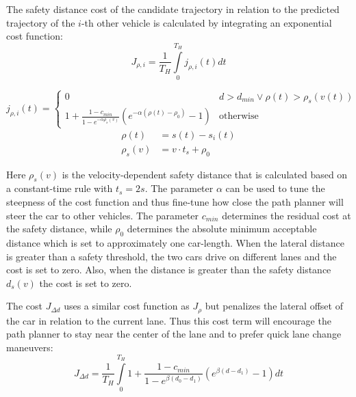 \documentclass[twoside]{article}
\begin{document}
The safety distance cost of the candidate trajectory in relation to the predicted trajectory of the $i$-th other vehicle is calculated by integrating an exponential cost function:
\begin{equation}
J_{\rho,i} = \frac{1}{T_H} \int\limits_0^{T_H} j_{\rho,i}(t) dt
\end{equation}

\begin{equation}
j_{\rho,i}(t) =
\begin{cases}
  0 & d > d_{min} \vee \rho(t) > \rho_s(v(t)) \\
  1 + \frac{1 - c_{min}}{1-e^{-\alpha \rho_s(v)}} \left(e^{-\alpha(\rho(t) - \rho_{0})} - 1 \right) & \text{otherwise}
  \end{cases}
\end{equation}
\begin{align}
\rho(t) &= s(t) - s_i(t) \\
\rho_s(v) &= v \cdot t_s + \rho_0
\end{align}

Here $\rho_s(v)$ is the velocity-dependent safety distance that is calculated based on
a constant-time rule with $t_s = 2s$. The parameter $\alpha$ can be used to tune the steepness
of the cost function and thus fine-tune how close the path planner will steer the car to
other vehicles. The parameter $c_{min}$ determines the residual cost at the safety distance,
while $\rho_0$ determines the absolute minimum acceptable distance which is set to approximately
one car-length. When the lateral distance is greater than a safety threshold, the two cars drive on different lanes and the cost is set to zero. Also, when the distance is greater than
the safety distance $d_s(v)$ the cost is set to zero.

The cost $J_{\Delta d}$ uses a similar cost function as $J_{\rho}$ but penalizes the lateral
offset of the car in relation to the current lane. Thus this cost term will encourage the
path planner to stay near the center of the lane and to prefer quick lane change maneuvers:
\begin{equation}
J_{\Delta d} = \frac{1}{T_H} \int\limits_0^{T_H} 1 + \frac{1 - c_{min}}{1 - e^{\beta(d_0 - d_1)}}
\left( e^{\beta(d-d_1)} - 1 \right) dt
\end{equation}

\end{document}
